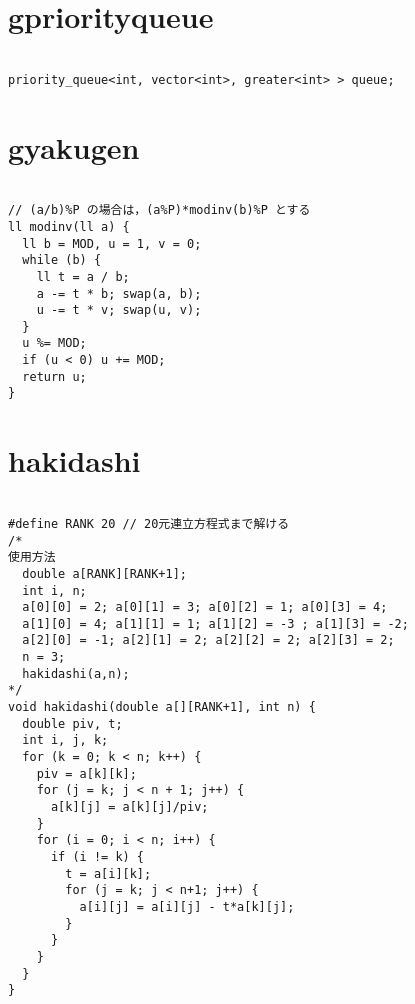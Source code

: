 \documentclass{jsarticle}
\begin{document}
\color{white}
\section{gpriorityqueue}
\color{black}
\begin{lstlisting}[caption=gpriorityqueue]

priority_queue<int, vector<int>, greater<int> > queue;

\end{lstlisting}

\color{white}
\section{gyakugen}
\color{black}
\begin{lstlisting}[caption=gyakugen]

// (a/b)%P の場合は，(a%P)*modinv(b)%P とする
ll modinv(ll a) {
  ll b = MOD, u = 1, v = 0;
  while (b) {
    ll t = a / b;
    a -= t * b; swap(a, b);
    u -= t * v; swap(u, v);
  }
  u %= MOD;
  if (u < 0) u += MOD;
  return u;
}

\end{lstlisting}

\color{white}
\section{hakidashi}
\color{black}
\begin{lstlisting}[caption=hakidashi]

#define RANK 20 // 20元連立方程式まで解ける
/*
使用方法
  double a[RANK][RANK+1];
  int i, n;
  a[0][0] = 2; a[0][1] = 3; a[0][2] = 1; a[0][3] = 4;
  a[1][0] = 4; a[1][1] = 1; a[1][2] = -3 ; a[1][3] = -2;
  a[2][0] = -1; a[2][1] = 2; a[2][2] = 2; a[2][3] = 2;
  n = 3;
  hakidashi(a,n);
*/
void hakidashi(double a[][RANK+1], int n) { 
  double piv, t;
  int i, j, k;
  for (k = 0; k < n; k++) {
    piv = a[k][k];
    for (j = k; j < n + 1; j++) {
      a[k][j] = a[k][j]/piv;
    }
    for (i = 0; i < n; i++) {
      if (i != k) {
        t = a[i][k];
        for (j = k; j < n+1; j++) {
          a[i][j] = a[i][j] - t*a[k][j];
        }
      }
    }
  }
}

\end{lstlisting}

\color{white}
\end{document}
